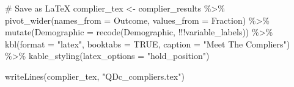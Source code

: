 \documentclass[
  letterpaper,
  DIV=11,
  numbers=noendperiod]{scrartcl}
\newenvironment{Shaded}{\begin{snugshade}}{\end{snugshade}}
\newcommand{\AttributeTok}[1]{\textcolor[rgb]{0.40,0.45,0.13}{#1}}
\newcommand{\CommentTok}[1]{\textcolor[rgb]{0.37,0.37,0.37}{#1}}
\newcommand{\ConstantTok}[1]{\textcolor[rgb]{0.56,0.35,0.01}{#1}}
\newcommand{\FunctionTok}[1]{\textcolor[rgb]{0.28,0.35,0.67}{#1}}
\newcommand{\NormalTok}[1]{\textcolor[rgb]{0.00,0.23,0.31}{#1}}
\newcommand{\OtherTok}[1]{\textcolor[rgb]{0.00,0.23,0.31}{#1}}
\newcommand{\SpecialCharTok}[1]{\textcolor[rgb]{0.37,0.37,0.37}{#1}}
\newcommand{\StringTok}[1]{\textcolor[rgb]{0.13,0.47,0.30}{#1}}
\begin{document}
\begin{Shaded}
\begin{Highlighting}[]
\CommentTok{\# Save as LaTeX}
\NormalTok{complier\_tex }\OtherTok{\textless{}{-}}\NormalTok{ complier\_results }\SpecialCharTok{\%\textgreater{}\%}
  \FunctionTok{pivot\_wider}\NormalTok{(}\AttributeTok{names\_from =}\NormalTok{ Outcome, }\AttributeTok{values\_from =}\NormalTok{ Fraction) }\SpecialCharTok{\%\textgreater{}\%}
  \FunctionTok{mutate}\NormalTok{(}\AttributeTok{Demographic =} \FunctionTok{recode}\NormalTok{(Demographic, }\SpecialCharTok{!!!}\NormalTok{variable\_labels)) }\SpecialCharTok{\%\textgreater{}\%}
  \FunctionTok{kbl}\NormalTok{(}\AttributeTok{format =} \StringTok{"latex"}\NormalTok{, }\AttributeTok{booktabs =} \ConstantTok{TRUE}\NormalTok{, }\AttributeTok{caption =} \StringTok{"Meet The Compliers"}\NormalTok{) }\SpecialCharTok{\%\textgreater{}\%}
  \FunctionTok{kable\_styling}\NormalTok{(}\AttributeTok{latex\_options =} \StringTok{"hold\_position"}\NormalTok{)}

\FunctionTok{writeLines}\NormalTok{(complier\_tex, }\StringTok{"QDc\_compliers.tex"}\NormalTok{) }
\end{Highlighting}
\end{Shaded}
\end{document}
